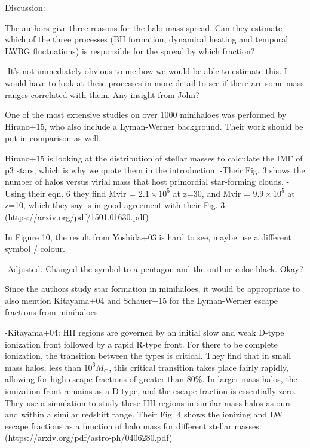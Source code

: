 \documentclass[11pt]{article}
\newenvironment{referee}[1][]{%
    \ignorespaces%
    \begin{mdframed}[style=myquotestyle,#1]%
}{%
    \end{mdframed}%
    \ignorespacesafterend%
}%
\begin{document}
\begin{referee}
Discussion:

The authors give three reasons for the halo mass spread. Can they estimate which of the three processes (BH formation, dynamical heating and temporal LWBG fluctuations) is responsible for the spread by which fraction?
\end{referee}
-It's not immediately obvious to me how we would be able to estimate this. I would have to look at these processes in more detail to see if there are some mass ranges correlated with them. Any insight from John?

\begin{referee}
One of the most extensive studies on over 1000 minihaloes was performed by Hirano+15, who also include a Lyman-Werner background. Their work should be put in comparison as well.
\end{referee}
Hirano+15 is looking at the distribution of stellar masses to calculate the IMF of p3 stars, which is why we quote them in the introduction. 
-Their Fig. 3 shows the number of halos versus virial mass that host primordial star-forming clouds. 
-Using their eqn. 6 they find Mvir = $2.1 \times 10^5$ at z=30, and Mvir = $9.9 \times 10^5$ at z=10, which they say is in good agreement with their Fig. 3. 
(https://arxiv.org/pdf/1501.01630.pdf)

\begin{referee}
In Figure 10, the result from Yoshida+03 is hard to see, maybe use a different symbol / colour.
\end{referee}
-Adjusted. Changed the symbol to a pentagon and the outline color black. Okay?

\begin{referee}
Since the authors study star formation in minihaloes, it would be appropriate to also mention Kitayama+04 and Schauer+15 for the Lyman-Werner escape fractions from minihaloes.
\end{referee}
-Kitayama+04: HII regions are governed by an initial slow and weak D-type ionization front followed by a rapid R-type front. For there to be complete ionization, the transition between the types is critical. They find that in small mass halos, less than $10^6 M_{\odot}$, this critical transition takes place fairly rapidly, allowing for high escape fractions of greater than 80\%. In larger mass halos, the ionization front remains as a D-type, and the escape fraction is essentially zero. They use a simulation to study these HII regions in similar mass halos as ours and within a similar redshift range. Their Fig. 4 shows the ionizing and LW escape fractions as a function of halo mass for different stellar masses. (https://arxiv.org/pdf/astro-ph/0406280.pdf)
\end{document}
